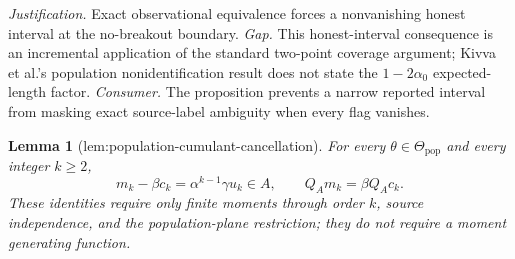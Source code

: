 \documentclass{article}
\newtheorem{lemma}{Lemma}
\begin{document}
\par\smallskip\noindent \textit{Justification.} Exact observational equivalence forces a nonvanishing honest interval at the no-breakout boundary. \textit{Gap.} This honest-interval consequence is an incremental application of the standard two-point coverage argument; Kivva et al.'s population nonidentification result does not state the \(1-2\alpha_0\) expected-length factor. \textit{Consumer.} The proposition prevents a narrow reported interval from masking exact source-label ambiguity when every flag vanishes.

\begin{lemma}[lem:population-cumulant-cancellation]\label{lem:population-cumulant-cancellation}
For every \(\theta\in\Theta_{\mathrm{pop}}\) and every integer \(k\geq2\),
\[
 m_k-\beta c_k=\alpha^{k-1}\gamma u_k\in A,
 \qquad Q_Am_k=\beta Q_Ac_k.
\]
These identities require only finite moments through order \(k\), source independence, and the population-plane restriction; they do not require a moment generating function.
\end{lemma}
\end{document}

